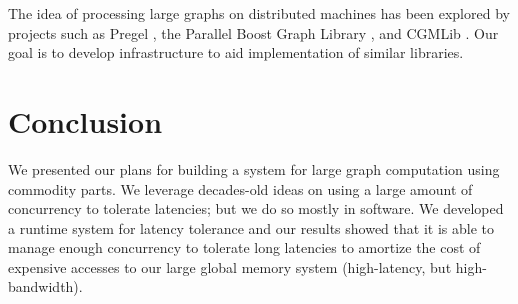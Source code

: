 \documentclass[10pt,nocopyrightspace,preprint]{sigplanconf}
\begin{document}
The idea of processing large graphs on distributed machines has been
explored by projects such as Pregel \cite{pregel}, the Parallel Boost
Graph Library \cite{parallelbgl}, and CGMLib \cite{cgmlib}. Our goal
is to develop infrastructure to aid implementation of similar
libraries.

\section{Conclusion}
\label{sec:conclusion}

We presented our plans for building a system for large graph
computation using commodity parts. We leverage decades-old ideas on
using a large amount of concurrency to tolerate latencies; but we do so
mostly in software. We developed a runtime system for latency
tolerance and our results showed that it is able to manage enough
concurrency to tolerate long latencies to amortize the cost of
expensive accesses to our large global memory system (high-latency,
but high-bandwidth).



\end{document}
